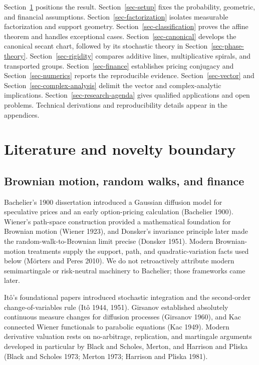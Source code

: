 \documentclass[
  english,
  10pt,
  letterpaper,
  DIV=11,
  numbers=noendperiod]{scrartcl}
\theoremstyle{definition}
\theoremstyle{plain}
\theoremstyle{plain}
\theoremstyle{remark}
\begin{document}
Section~\ref{sec-literature} positions the result.
Section~\ref{sec-setup} fixes the probability, geometric, and financial
assumptions. Section~\ref{sec-factorization} isolates measurable
factorization and support geometry. Section~\ref{sec-classification}
proves the affine theorem and handles exceptional cases.
Section~\ref{sec-canonical} develops the canonical secant chart,
followed by its stochastic theory in Section~\ref{sec-phase-theory}.
Section~\ref{sec-rigidity} compares additive lines, multiplicative
spirals, and transported groups. Section~\ref{sec-finance} establishes
pricing conjugacy and Section~\ref{sec-numerics} reports the
reproducible evidence. Section~\ref{sec-vector} and
Section~\ref{sec-complex-analysis} delimit the vector and
complex-analytic implications. Section~\ref{sec-research-agenda} gives
qualified applications and open problems. Technical derivations and
reproducibility details appear in the appendices.

\section{Literature and novelty boundary}\label{sec-literature}

\subsection{Brownian motion, random walks, and
finance}\label{brownian-motion-random-walks-and-finance}

Bachelier's 1900 dissertation introduced a Gaussian diffusion model for
speculative prices and an early option-pricing calculation (Bachelier
1900). Wiener's path-space construction provided a mathematical
foundation for Brownian motion (Wiener 1923), and Donsker's invariance
principle later made the random-walk-to-Brownian limit precise (Donsker
1951). Modern Brownian-motion treatments supply the support, path, and
quadratic-variation facts used below (Mörters and Peres 2010). We do not
retroactively attribute modern semimartingale or risk-neutral machinery
to Bachelier; those frameworks came later.

Itô's foundational papers introduced stochastic integration and the
second-order change-of-variables rule (Itô 1944, 1951). Girsanov
established absolutely continuous measure changes for diffusion
processes (Girsanov 1960), and Kac connected Wiener functionals to
parabolic equations (Kac 1949). Modern derivative valuation rests on
no-arbitrage, replication, and martingale arguments developed in
particular by Black and Scholes, Merton, and Harrison and Pliska (Black
and Scholes 1973; Merton 1973; Harrison and Pliska 1981).
\end{document}
